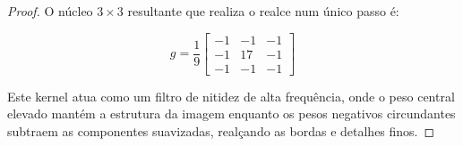 \documentclass[a4paper,12pt]{article}
\begin{document}
\begin{proof}
O núcleo $3\times3$ resultante que realiza o realce num único passo é:


$$g = \frac{1}{9} \begin{bmatrix} -1 & -1 & -1 \\ -1 & 17 & -1 \\ -1 & -1 & -1 \end{bmatrix}$$

Este kernel atua como um filtro de nitidez de alta frequência, onde o peso central elevado mantém a estrutura da imagem enquanto os pesos negativos circundantes subtraem as componentes suavizadas, realçando as bordas e detalhes finos.

\end{proof}
\end{document}
